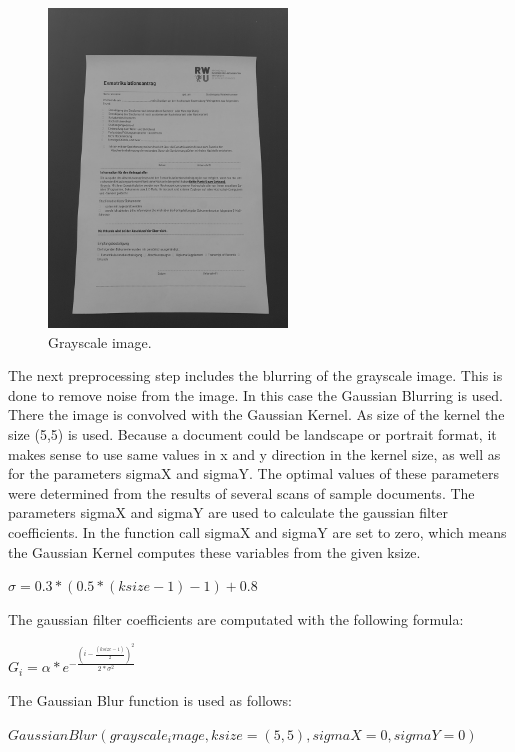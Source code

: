 \documentclass[twocolumn,10pt]{asme2ej}
\begin{document}
\noindent
\begin{figure}[H]
    \centerline{\includegraphics[width=2.5in]{output/hoch_3_2_grayscaleimg.jpg}}
    \caption{Grayscale image.}
    \label{fig:grayscale}
\end{figure}
\noindent
The next preprocessing step includes the blurring of the grayscale image.
This is done to remove noise from the image\cite{opencv_smoothingimages}. In this case
the Gaussian Blurring\cite{opencv_gaussianblur} is used. There the image is convolved with the Gaussian Kernel.
As size of the kernel the size (5,5) is used.
Because a document could be landscape or portrait format, 
it makes sense to use same values in x and y direction in the kernel size, as well as for the parameters
sigmaX and sigmaY.
The optimal values of these parameters were determined from the results of several scans of sample documents.
The parameters sigmaX and sigmaY are used to calculate the gaussian filter coefficients. In the function call
sigmaX and sigmaY are set to zero, which means the Gaussian Kernel computes these variables from the given
ksize\cite{opencv_getgaussiankernel}.
\begin{center}
    $\sigma = 0.3 * (0.5 * (ksize - 1 ) - 1) + 0.8$
    \label{eq_sigma}
\end{center}
The gaussian filter coefficients are computated with the following formula\cite{opencv_getgaussiankernel}:
\begin{center}
    $G_i = \alpha * e^{- \frac{(i - \frac{(ksize - 1)}{2})^2}{2*\sigma^2 } }$
    \label{eq_sigma}
\end{center}
\noindent
The Gaussian Blur\cite{opencv_gaussianblur} function is used as follows:
\begin{center}
    \noindent
    $GaussianBlur(grayscale_image, ksize=(5,5),sigmaX=0,sigmaY=0)$
\end{center}
\end{document}
